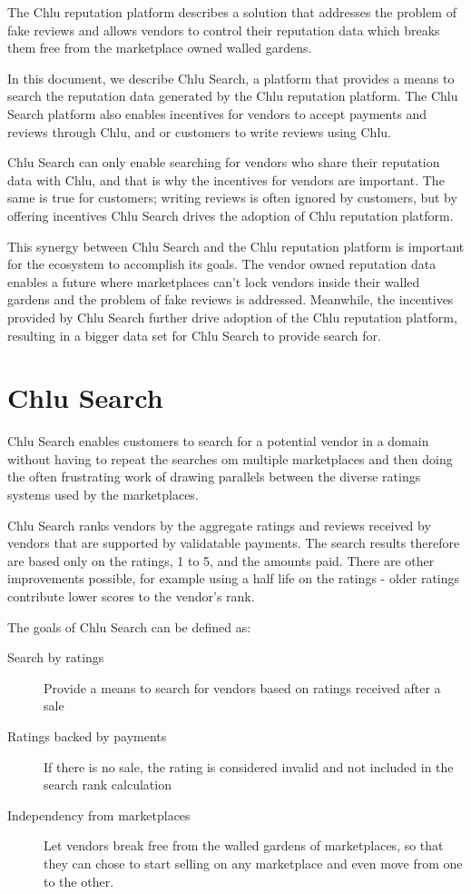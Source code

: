 \documentclass[a4paper]{article}
\begin{document}
The Chlu reputation platform\cite{chlu-reputation} describes a
solution that addresses the problem of fake reviews and allows vendors
to control their reputation data which breaks them free from the
marketplace owned walled gardens.

In this document, we describe Chlu Search, a platform that provides a
means to search the reputation data generated by the Chlu reputation
platform. The Chlu Search platform also enables incentives for vendors
to accept payments and reviews through Chlu, and or customers to write
reviews using Chlu.

Chlu Search can only enable searching for vendors who share their
reputation data with Chlu, and that is why the incentives for vendors
are important. The same is true for customers; writing reviews is
often ignored by customers, but by offering incentives Chlu Search
drives the adoption of Chlu reputation platform.

This synergy between Chlu Search and the Chlu reputation platform is
important for the ecosystem to accomplish its goals. The vendor owned
reputation data enables a future where marketplaces can't lock vendors
inside their walled gardens and the problem of fake reviews is
addressed. Meanwhile, the incentives provided by Chlu Search further
drive adoption of the Chlu reputation platform, resulting in a bigger
data set for Chlu Search to provide search for.

\section{Chlu Search}

Chlu Search enables customers to search for a potential vendor in a
domain without having to repeat the searches om multiple marketplaces
and then doing the often frustrating work of drawing parallels between
the diverse ratings systems used by the marketplaces.

Chlu Search ranks vendors by the aggregate ratings and reviews
received by vendors that are supported by validatable payments. The
search results therefore are based only on the ratings, 1 to 5, and
the amounts paid. There are other improvements possible, for example
using a half life on the ratings - older ratings contribute lower
scores to the vendor's rank.

The goals of Chlu Search can be defined as:

\begin{description}
\item[Search by ratings] Provide a means to search for vendors based
  on ratings received after a sale
\item[Ratings backed by payments] If there is no sale, the rating is
  considered invalid and not included in the search rank calculation
\item[Independency from marketplaces] Let vendors break free from the
  walled gardens of marketplaces, so that they can chose to start
  selling on any marketplace and even move from one to the other.
\end{description}
\end{document}
